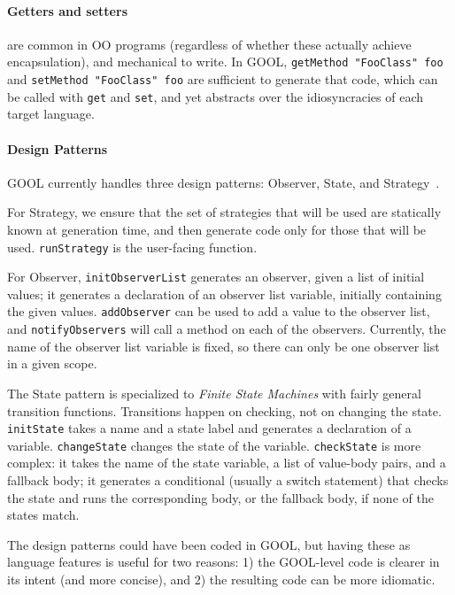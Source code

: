 \documentclass[sigplan,screen,10pt]{acmart}
\begin{document}
\paragraph{Getters and setters} are common in OO programs (regardless of
whether these actually achieve encapsulation), and mechanical to write.
In GOOL, \verb|getMethod "FooClass" foo| and \verb|setMethod "FooClass" foo|
are sufficient to generate that code, which can be called with
\verb|get| and \verb|set|, and yet abstracts over the idiosyncracies of
each target language.

\paragraph{Design Patterns}
GOOL currently handles three design patterns: Observer,
State, and Strategy~\cite{gamma1995design}. 

For Strategy, we ensure that the set of
strategies that will be used are statically known at generation
time, and then generate code only for those that will
be used.  \verb|runStrategy| is the user-facing function.

For Observer, \verb|initObserverList| generates an observer, given a list
of initial values; it generates a declaration of
an observer list variable, initially containing the given values.
\verb|addObserver| can be used to add a value to the observer list, and
\verb|notifyObservers| will call a method on each of the observers. Currently,
the name of the observer list variable is fixed, so there can only be one
observer list in a given scope.

The State pattern is specialized to \emph{Finite State Machines}
with fairly general transition functions.  Transitions happen on checking, not
on changing the state. \verb|initState| takes a name and a state label and
generates a declaration of a variable.
\verb|changeState| changes the state of the variable.
\verb|checkState| is more complex:  it takes the name of the state variable, a
list of value-body pairs, and a fallback body; it generates a conditional
(usually a switch statement) that checks the state and runs the corresponding
body, or the fallback body, if none of the states match.

The design patterns could have been coded in GOOL, but
having these as language features is useful for two reasons: 1) the GOOL-level
code is clearer in its intent (and more concise), and 2) the resulting code
can be more idiomatic.
\end{document}

